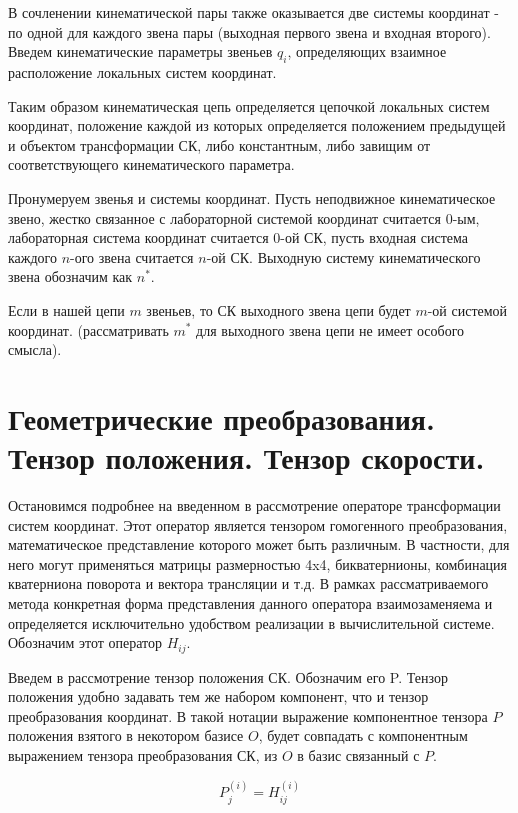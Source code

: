 \documentclass{article}
\begin{document}
В сочленении кинематической пары также оказывается две системы координат - по одной для каждого звена пары (выходная первого звена и входная второго). Введем кинематические параметры звеньев $q_i$, определяющих взаимное расположение локальных систем координат.

Таким образом кинематическая цепь определяется цепочкой локальных систем координат, положение каждой из которых определяется положением предыдущей и объектом трансформации СК, либо константным, либо завищим от соответствующего кинематического параметра.

Пронумеруем звенья и системы координат. Пусть неподвижное кинематическое звено, жестко связанное с лабораторной системой координат считается 0-ым, лабораторная система координат считается 0-ой СК, пусть входная система каждого $n$-ого звена считается $n$-ой СК. Выходную систему кинематического звена обозначим как $n^*$. 

Если в нашей цепи $m$ звеньев, то СК выходного звена цепи будет $m$-ой системой координат. (рассматривать $m^*$ для выходного звена цепи не имеет особого смысла).

\newpage
\section{Геометрические преобразования. Тензор положения. Тензор скорости.}

Остановимся подробнее на введенном в рассмотрение операторе трансформации систем координат. Этот оператор является тензором гомогенного преобразования, математическое представление которого может быть различным. В частности, для него могут применяться матрицы размерностью 4x4, бикватернионы, комбинация кватерниона поворота и вектора трансляции и т.д. В рамках рассматриваемого метода конкретная форма представления данного оператора взаимозаменяема и определяется исключительно удобством реализации в вычислительной системе. Обозначим этот оператор $H_{ij}$.

Введем в рассмотрение тензор положения СК. Обозначим его P. Тензор положения удобно задавать тем же набором компонент, что и тензор преобразования координат. В такой нотации выражение компонентное тензора $P$ положения взятого в некотором базисе $O$, будет совпадать с компонентным выражением тензора преобразования СК, из $O$ в базис связанный с $P$. 

\begin{equation}
P_j^{(i)} = H_{ij}^{(i)}
\end{equation}
\end{document}
